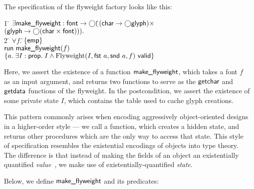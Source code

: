 \documentclass[preprint,natbib]{sigplanconf}
\begin{document}
The specification of the flyweight factory looks like this:

{\small
\begin{tabbing}
1 \qquad \= $\exists \mbox{\textsf{{make\_flyweight}}} :
\mbox{\textsf{{font}}} \to \bigcirc($\=$(\mbox{\textsf{{char}}} \to \bigcirc{\mbox{\textsf{{glyph}}}}) \times$ \\
\> \> $(\mbox{\textsf{{glyph}}} \to \bigcirc{(\mbox{\textsf{{char}}}\times \mbox{\textsf{{font}}})})).$\\
2 \> \;\;\= $\forall f.\;$\=$\{{\mathsf{emp}}\}$ \\
  \>\> \> $\mbox{\textsf{{run }}}{\mbox{\textsf{{make\_flyweight}}}(f)}$ \\
  \>\> \> $\{{a.\; \exists I:\mbox{\textsf{{prop}}}.\; I \land {\mbox{Flyweight}(I, \mbox{\textsf{{fst }}} a, \mbox{\textsf{{snd }}} a, f)}\mbox{\textsf{{ valid}}}}\}$ \\
\end{tabbing}
}

Here, we assert the existence of a function $\mbox{\textsf{{make\_flyweight}}}$,
which takes a font $f$ as an input argument, and returns two functions
to serve as the $\mbox{\textsf{{getchar}}}$ and $\mbox{\textsf{{getdata}}}$ functions of
the flyweight. In the postcondition, we assert the existence of some
private state $I$, which contains the table used to cache glyph
creations. 

This pattern commonly arises when encoding aggressively
object-oriented designs in a higher-order style --- we call a
function, which creates a hidden state, and returns other procedures
which are the only way to access that state. This style of
specification resembles the existential encodings of objects into type
theory. The difference is that instead of making the fields of an
object an existentially quantified \emph{value}~\cite{pierce-turner}, we
make use of existentially-quantified \emph{state}.

Below, we define $\mbox{\textsf{{make\_flyweight}}}$ and its predicates:
\end{document}
